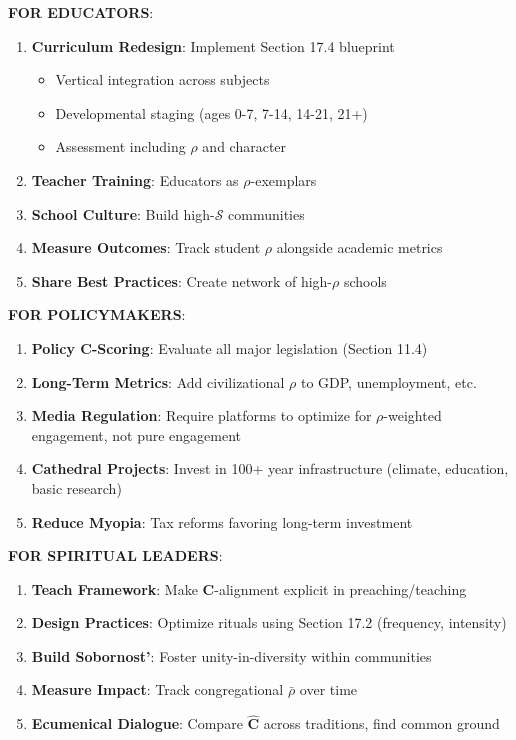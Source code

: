 \documentclass[11pt,a4paper]{article}
\theoremstyle{definition}
\theoremstyle{remark}
\begin{document}
\begin{enumerate}
\begin{protocol}
\begin{mdframed}[backgroundcolor=green!10,linewidth=2pt]
\textbf{FOR EDUCATORS}:
\begin{enumerate}
    \item \textbf{Curriculum Redesign}: Implement Section 17.4 blueprint
        \begin{itemize}[nosep]
            \item Vertical integration across subjects
            \item Developmental staging (ages 0-7, 7-14, 14-21, 21+)
            \item Assessment including \(\rho\) and character
        \end{itemize}
    \item \textbf{Teacher Training}: Educators as \(\rho\)-exemplars
    \item \textbf{School Culture}: Build high-\(\mathcal{S}\) communities
    \item \textbf{Measure Outcomes}: Track student \(\rho\) alongside academic metrics
    \item \textbf{Share Best Practices}: Create network of high-\(\rho\) schools
\end{enumerate}

\textbf{FOR POLICYMAKERS}:
\begin{enumerate}
    \item \textbf{Policy \(\mathbf{C}\)-Scoring}: Evaluate all major legislation (Section 11.4)
    \item \textbf{Long-Term Metrics}: Add civilizational \(\rho\) to GDP, unemployment, etc.
    \item \textbf{Media Regulation}: Require platforms to optimize for \(\rho\)-weighted engagement, not pure engagement
    \item \textbf{Cathedral Projects}: Invest in 100+ year infrastructure (climate, education, basic research)
    \item \textbf{Reduce Myopia}: Tax reforms favoring long-term investment
\end{enumerate}

\textbf{FOR SPIRITUAL LEADERS}:
\begin{enumerate}
    \item \textbf{Teach Framework}: Make \(\mathbf{C}\)-alignment explicit in preaching/teaching
    \item \textbf{Design Practices}: Optimize rituals using Section 17.2 (frequency, intensity)
    \item \textbf{Build Sobornost'}: Foster unity-in-diversity within communities
    \item \textbf{Measure Impact}: Track congregational \(\bar{\rho}\) over time
    \item \textbf{Ecumenical Dialogue}: Compare \(\hat{\mathbf{C}}\) across traditions, find common ground
\end{enumerate}
\end{mdframed}


\end{protocol}
\end{enumerate}
\end{document}
